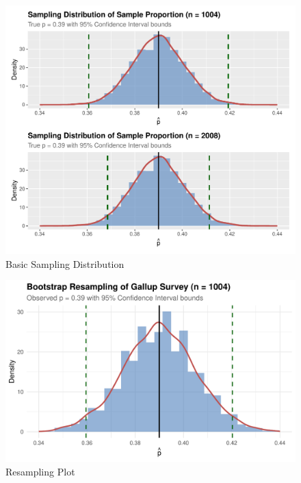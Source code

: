 \documentclass{article}\usepackage[]{graphicx}\usepackage[]{xcolor}
\begin{document}
\begin{figure}[H]
  \begin{center}
  \includegraphics[width=\textwidth]{basic.sim.plots.pdf}
  \caption{Basic Sampling Distribution}
  \label{plot1}
  \end{center}
\end{figure}

\begin{figure}[H]
  \begin{center}
  \includegraphics[width=\textwidth]{resample.plot.pdf}
  \caption{Resampling Plot}
  \label{plot2}
  \end{center}
\end{figure}
\end{document}
